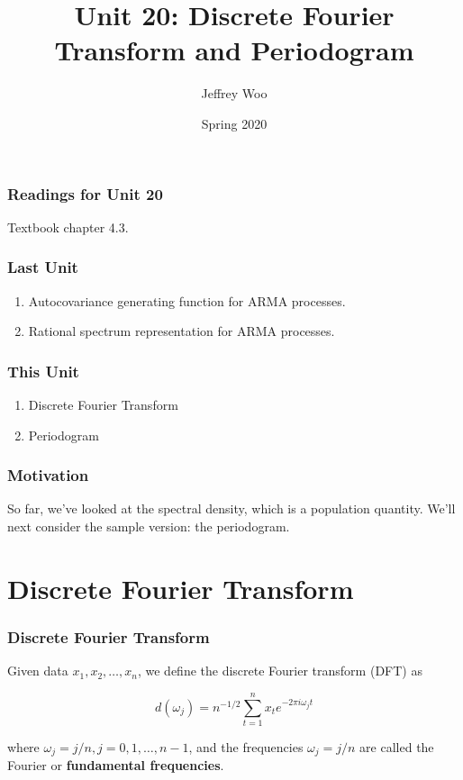 \documentclass[%
xcolor=pdftex]{beamer}
\title{Unit 20: Discrete Fourier Transform and Periodogram}
\author[STAT 5170: Applied Time Series, Unit 20]{Jeffrey Woo}
\institute{Department of Statistics, University of Virginia}
\date{Spring 2020} %
\begin{document}
\frame{\titlepage}


\begin{frame}
\frametitle{Readings for Unit 20}

Textbook chapter 4.3.

\end{frame}



\begin{frame}
\frametitle{Last Unit}
\begin{enumerate}
\item Autocovariance generating function for ARMA processes.
\item Rational spectrum representation for ARMA processes.
\end{enumerate}
\end{frame}

\begin{frame}
\frametitle{This Unit}
\begin{enumerate}
\item Discrete Fourier Transform
\item Periodogram
\end{enumerate}
\end{frame}

\begin{frame}
\frametitle{Motivation}

So far, we've looked at the spectral density, which is a population quantity. We'll next consider the sample version: the periodogram.

\end{frame}

\section{Discrete Fourier Transform}
\frame{\tableofcontents[currentsection]}

\begin{frame}
\frametitle{Discrete Fourier Transform}

Given data $x_1,x_2,\ldots,x_n$, we define
the discrete Fourier transform (DFT) as

\begin{equation} \label{eq:DFT}
d(\omega_j)=n^{-1/2} \sum_{t=1}^n x_t e^{-2 \pi i \omega_j t}
\end{equation}

where $\omega_j= j/n, j=0,1,\ldots,n-1$, and the frequencies $\omega_j = j/n$ are called the Fourier or \textbf{fundamental frequencies}.
\end{frame}
\end{document}
